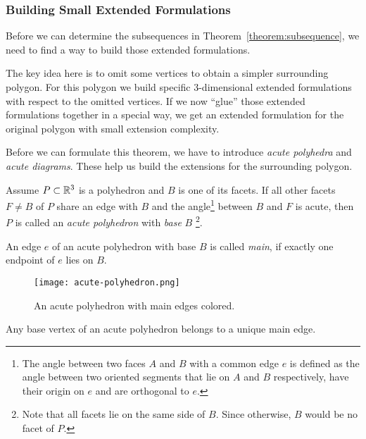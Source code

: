 \subsubsection{Building Small Extended Formulations}

Before we can determine the subsequences in Theorem~\ref{theorem:subsequence}, we need to find a way to build those extended formulations.

The key idea here is to omit some vertices to obtain a simpler surrounding polygon. For this polygon we build specific 3-dimensional extended formulations with respect to the omitted vertices. If we now ``glue'' those extended formulations together in a special way, we get an extended formulation for the original polygon with small extension complexity.

Before we can formulate this theorem, we have to introduce \emph{acute polyhedra} and \emph{acute diagrams}. These help us build the extensions for the surrounding polygon.

\begin{definition}\label{definition:acute-polyhedron}
  Assume $P \subset \mathbb{R}^3$ is a polyhedron and $B$ is one of its facets. If all other facets $F \neq B$ of $P$ 
  share an edge with $B$ and
  the angle\footnote{The angle between two faces $A$ and $B$ with a common edge $e$ is defined as the angle between two oriented segments that lie on $A$ and $B$ respectively, have their origin on $e$ and are orthogonal to $e$.} between $B$ and $F$ is acute,
  then $P$ is called an \emph{acute polyhedron} with \emph{base} $B$ \footnote{Note that all facets lie on the same side of $B$. Since otherwise, $B$ would be no facet of $P$.}.
\end{definition}

\begin{definition}
  An edge $e$ of an acute polyhedron with base $B$ is called \emph{main}, if exactly one endpoint of $e$ lies on $B$.
\end{definition}

\begin{figure}[h]
  \centering
  \texttt{[image: acute-polyhedron.png]}
  \caption{An acute polyhedron with main edges colored.}
  \label{fig:acute-polyhedron}
\end{figure}

\begin{lemma}
  Any base vertex of an acute polyhedron belongs to a unique main edge.
\end{lemma}

